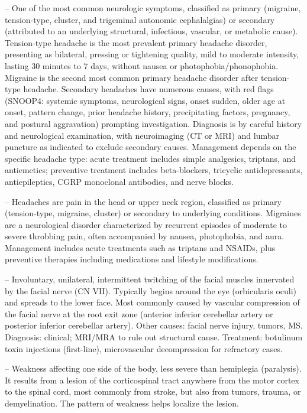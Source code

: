 -- One of the most common neurologic symptoms, classified as primary (migraine, tension-type, cluster, and trigeminal autonomic cephalalgias) or secondary (attributed to an underlying structural, infectious, vascular, or metabolic cause). Tension-type headache is the most prevalent primary headache disorder, presenting as bilateral, pressing or tightening quality, mild to moderate intensity, lasting 30 minutes to 7 days, without nausea or photophobia/phonophobia. Migraine is the second most common primary headache disorder after tension-type headache. Secondary headaches have numerous causes, with red flags (SNOOP4: systemic symptoms, neurological signs, onset sudden, older age at onset, pattern change, prior headache history, precipitating factors, pregnancy, and postural aggravation) prompting investigation. Diagnosis is by careful history and neurological examination, with neuroimaging (CT or MRI) and lumbar puncture as indicated to exclude secondary causes. Management depends on the specific headache type: acute treatment includes simple analgesics, triptans, and antiemetics; preventive treatment includes beta-blockers, tricyclic antidepressants, antiepileptics, CGRP monoclonal antibodies, and nerve blocks.

-- Headaches are pain in the head or upper neck region, classified as primary (tension-type, migraine, cluster) or secondary to underlying conditions. Migraines are a neurological disorder characterized by recurrent episodes of moderate to severe throbbing pain, often accompanied by nausea, photophobia, and aura. Management includes acute treatments such as triptans and NSAIDs, plus preventive therapies including medications and lifestyle modifications.

-- Involuntary, unilateral, intermittent twitching of the facial muscles innervated by the facial nerve (CN VII). Typically begins around the eye (orbicularis oculi) and spreads to the lower face. Most commonly caused by vascular compression of the facial nerve at the root exit zone (anterior inferior cerebellar artery or posterior inferior cerebellar artery). Other causes: facial nerve injury, tumors, MS. Diagnosis: clinical; MRI/MRA to rule out structural cause. Treatment: botulinum toxin injections (first-line), microvascular decompression for refractory cases.

-- Weakness affecting one side of the body, less severe than hemiplegia (paralysis). It results from a lesion of the corticospinal tract anywhere from the motor cortex to the spinal cord, most commonly from stroke, but also from tumors, trauma, or demyelination. The pattern of weakness helps localize the lesion.


